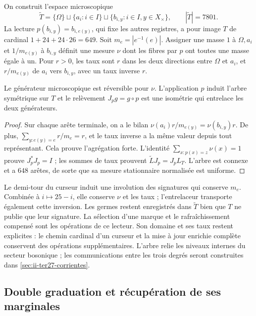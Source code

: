 On construit l’espace microscopique
\[
 \widetilde T=\{\Omega\}\sqcup\{a_i:i\in I\}
 \sqcup\{b_{i,y}:i\in I,y\in X_\times\},\qquad |\widetilde T|=7801.
\]
La lecture $p(b_{i,y})=b_{i,e(y)}$, qui fixe les autres registres, a pour
image $T$ de cardinal $1+24+24\cdot26=649$. Soit $m_e=|e^{-1}(e)|$.
Assigner une masse $1$ à $\Omega,a_i$ et $1/m_{e(y)}$ à $b_{i,y}$ définit
une mesure $\nu$ dont les fibres par $p$ ont toutes une masse égale à un. Pour
$r>0$, les taux sont $r$ dans les deux directions entre $\Omega$ et $a_i$,
et $r/m_{e(y)}$ de $a_i$ vers $b_{i,y}$, avec un taux inverse $r$.

\begin{proposition}
\label{prop:ii-ter27-arbol}
Le générateur microscopique est réversible pour $\nu$. L’application $p$
induit l’arbre symétrique sur $T$ et le relèvement $J_pg=g\circ p$
est une isométrie qui entrelace les deux générateurs.
\end{proposition}
\begin{proof}
Sur chaque arête terminale, on a le bilan
$\nu(a_i)r/m_{e(y)}=\nu(b_{i,y})r$. De plus,
$\sum_{y:e(y)=e}r/m_e=r$, et le taux inverse a la même valeur depuis
tout représentant. Cela prouve l’agrégation forte. L’identité
$\sum_{x:p(x)=z}\nu(x)=1$ prouve $J_p^*J_p=I$ ; les sommes de taux
prouvent $\widetilde L J_p=J_pL_T$. L’arbre est connexe et a
$648$ arêtes, de sorte que sa mesure stationnaire normalisée est uniforme.
\end{proof}
Le demi-tour du curseur induit une involution des signatures qui conserve
$m_e$. Combinée à $i\mapsto25-i$, elle conserve $\nu$ et les taux ;
l’entrelaceur transporte également cette inversion. Les germes restent
enregistrés dans $\widetilde T$ bien que $T$ ne publie que leur signature.
La sélection d’une marque et le rafraîchissement compensé sont les opérations
de ce lecteur. Son domaine et ses taux restent explicites : le chemin
cardinal d’un curseur et la mise à jour enrichie complète conservent
des opérations supplémentaires. L’arbre relie les niveaux internes du
secteur bosonique ; les communications entre les trois degrés seront construites
dans \ref{sec:ii-ter27-corrientes}.

\subsection{Double graduation et récupération de ses marginales}
\label{sec:ii-ter27-doble}

